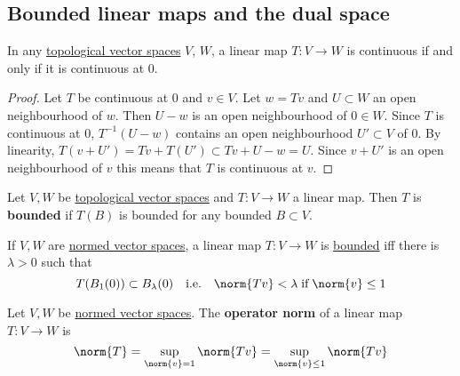 \documentclass{article}
\begin{document}
\subsection{Bounded linear maps and the dual space}

\begin{fact}
    In any \hyperlink{def:topologicalVectorSpace}{topological vector spaces} $V$, $W$, a linear map $T: V \to W$ is continuous if and only if it is continuous at $0$.
\end{fact}

\begin{proof}
    Let $T$ be continuous at $0$ and $v \in V$. Let $w = Tv$ and $U \subset W$ an open neighbourhood of $w$. Then $U - w$ is an open neighbourhood of $0 \in W$. Since $T$ is continuous at $0$, $T^{-1}(U - w)$ contains an open neighbourhood $U' \subset V$ of $0$.
    By linearity, $T(v + U') = Tv + T(U') \subset Tv + U - w = U$.  Since $v + U'$ is an open neighbourhood of $v$ this means that $T$ is continuous at $v$.
\end{proof}

\begin{defi}
    Let $V, W$ be \hyperlink{def:topologicalVectorSpace}{topological vector spaces} and $T: V \to W$ a linear map. Then $T$ is \textbf{bounded} if $T(B)$ is bounded for any bounded $B \subset V$.
\end{defi}

\begin{fact}
    If $V, W$ are \hyperlink{def:normedVectorSpace}{normed vector spaces}, a linear map $T: V \to W$ is \hyperlink{def:boundedLinearMap}{bounded} iff there is $\lambda > 0$ such that
    \begin{equation*}
        T(B_1(0)) \subset B_\lambda(0) \quad \text{i.e.} \quad \norm{Tv} < \lambda \; \text{if} \; \norm{v} \le 1
    \end{equation*}
\end{fact}

\begin{defi}
    Let $V, W$ be \hyperlink{def:normedVectorSpace}{normed vector spaces}. The \textbf{operator norm} of a linear map $T: V \to W$ is
    \begin{equation*}
        \norm{T} = \sup_{\norm{v} = 1} \norm{T v} =\sup_{\norm{v} \leq 1} \norm{T v}
    \end{equation*}
\end{defi}
\end{document}
